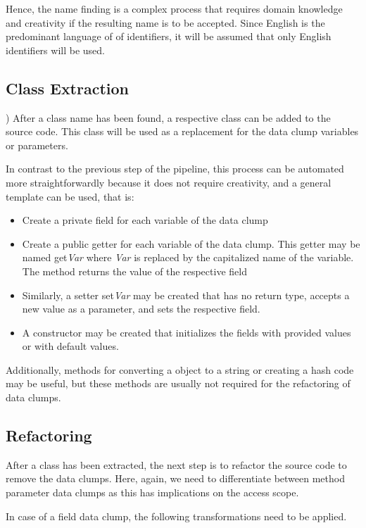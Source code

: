 Hence, the name finding is a complex process that requires domain knowledge and creativity if the resulting name is to be accepted. 
Since English is the predominant language of of identifiers, it will be assumed that only English identifiers will be used. 


\subsection{Class Extraction}\label{subsec:chap3_data_class_extraction})
After a class name has been found, a respective class can be added to the source code. This class will be used as a replacement  for the data clump variables or parameters. 

In contrast to the previous step of the pipeline, this process can be automated more straightforwardly because it does not require creativity, and a general template can be used, that is:
\begin{itemize}
    \item Create a private field for each variable of the data clump
    \item Create a public getter for each variable of the data clump. This getter may be named get\textit{Var} where \textit{Var} is replaced by the capitalized name of the variable. The method returns the value of the respective field
    \item Similarly, a setter set\textit{Var} may be created that has no return type, accepts a new value as a parameter, and sets the respective field. 
    \item A constructor may be created that initializes the fields with provided values or with default values. 
\end{itemize}

Additionally, methods for converting a object to a string or creating a hash code may be useful, but these methods are usually not required for the refactoring of data clumps. 


\subsection{Refactoring}
After a class has been extracted, the next step is to refactor the source code to remove the data clumps. Here, again, we need to differentiate between method parameter data clumps as this has implications on the access scope. 

In case of a field data clump, the following transformations need to be applied.

